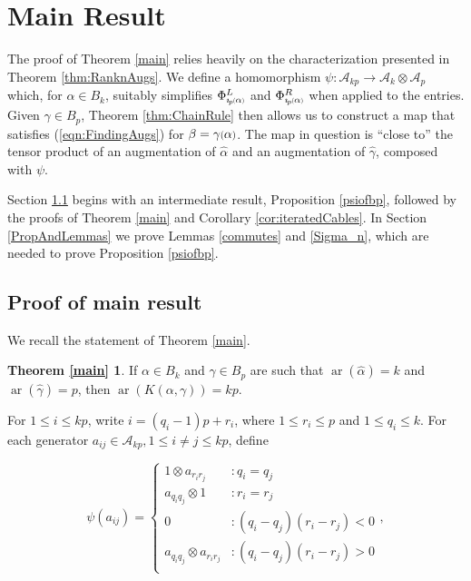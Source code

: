 \documentclass[11pt]{amsart}
\def\A{{\mathcal A}}
\def\cl{\mathcal}
\def\ar{\operatorname{ar}}
\newcommand*{\smallp}[1]{\scalebox{.75}{\ensuremath#1}}
\newcommand*{\subsmallp}[1]{\scalebox{.5}{\ensuremath#1}}
\newcommand{\subpp}[2][p]{\imath_{\hspace*{-1pt}#1}\hspace*{-.5pt}\subsmallp(#2\subsmallp)}
\theoremstyle{definition}
\begin{document}
\section{Main Result}
\label{SecMain}
The proof of Theorem \ref{main} relies heavily on the characterization presented in Theorem \ref{thm:RanknAugs}. We define a homomorphism $\psi:\cl A_{kp}\to\cl A_k\otimes\cl A_p$ which, for $\alpha\in B_k$, suitably simplifies $\Phi_{\subpp\alpha}^L$ and $\Phi_{\subpp\alpha}^R$ when applied to the entries. Given $\gamma\in B_p$, Theorem \ref{thm:ChainRule} then allows us to construct a map that satisfies (\ref{eqn:FindingAugs}) for $\beta=\gamma\smallp(\alpha\smallp)$. The map in question is ``close to'' the tensor product of an augmentation of $\hat\alpha$ and an augmentation of $\hat\gamma$, composed with $\psi$.

Section \ref{MainProof} begins with an intermediate result, Proposition \ref{psiofbp}, followed by the proofs of Theorem \ref{main} and Corollary \ref{cor:iteratedCables}.  In Section \ref{PropAndLemmas} we prove Lemmas \ref{commutes} and \ref{Sigma_n}, which are needed to prove Proposition \ref{psiofbp}.

\subsection{Proof of main result}
\label{MainProof}
We recall the statement of Theorem \ref{main}.

\newtheorem*{main}{Theorem \ref{main}}
\begin{main}
If $\alpha\in B_k$ and $\gamma\in B_p$ are such that $\ar(\hat{\alpha})=k$ and $\ar(\hat{\gamma})=p$, then $\ar(K(\alpha,\gamma))=kp$.
\end{main}

For $1\le i\le kp$, write $i = (q_i-1)p + r_i$, where $1\le r_i \le p$ and $1\le q_i\le k$.  For each generator $a_{ij}\in\A_{kp}, 1\le i\ne j\le kp$, define

\begin{equation}
\psi(a_{ij}) =
  \begin{cases}
         1\otimes a_{r_ir_j} & \colon q_i = q_j\\
         a_{q_iq_j}\otimes 1 & \colon r_i = r_j\\
         0 & \colon (q_i-q_j)(r_i-r_j)<0\\
         a_{q_iq_j}\otimes a_{r_ir_j} & \colon (q_i-q_j)(r_i-r_j)>0\\
  \end{cases},
  \label{defn:psi}
\end{equation}
\end{document}
